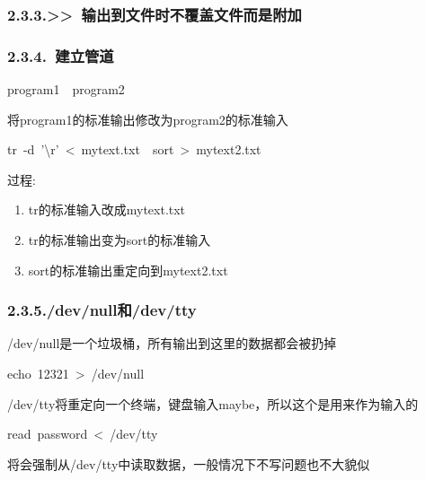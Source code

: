 \documentclass{article}
\begin{document}
\subsubsection{2.3.3.\hspace*{0.5em}\textgreater{}\textgreater{}~输出到文件时不覆盖文件而是附加}\label{sec--}%

\subsubsection{2.3.4.\hspace*{0.5em}\textbar{}~建立管道}\label{sec--}%
\begin{mdpre}%
\noindent{}program1~\textbar{}~program2%
\end{mdpre}\noindent{}将program1的标准输出修改为program2的标准输入
\begin{mdpre}%
\noindent{}tr~-d~'\textbackslash{}r'~\textless{}~mytext.txt~\textbar{}~sort~\textgreater{}~mytext2.txt%
\end{mdpre}\noindent{}过程:

\begin{enumerate}[noitemsep,topsep=\mdcompacttopsep]%

\item{}tr的标准输入改成mytext.txt %

\item{}tr的标准输出变为sort的标准输入 %

\item{}sort的标准输出重定向到mytext2.txt %
\end{enumerate}%

\subsubsection{2.3.5.\hspace*{0.5em}/dev/null和/dev/tty}\label{sec-devnulldevtty}%

\noindent{}/dev/null是一个垃圾桶，所有输出到这里的数据都会被扔掉 %
\begin{mdpre}%
\noindent{}echo~12321~\textgreater{}~/dev/null%
\end{mdpre}\noindent{}/dev/tty将重定向一个终端，键盘输入maybe，所以这个是用来作为输入的
\begin{mdpre}%
\noindent{}read~password~\textless{}~/dev/tty%
\end{mdpre}\noindent{}将会强制从/dev/tty中读取数据，一般情况下不写问题也不大貌似
\end{document}
